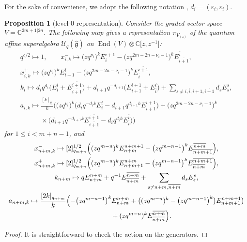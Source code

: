 \documentclass[pdftex]{sigma}
\numberwithin{equation}{section}
\newtheorem{Proposition}[Theorem]{Proposition}
 { \theoremstyle{definition}
\newtheorem{Definition}[Theorem]{Definition}
\newtheorem{Note}[Theorem]{Note}
\newtheorem{Example}[Theorem]{Example}
\newtheorem{Remark}[Theorem]{Remark} }
\begin{document}
For the sake of convenience, we adopt the following notation
, $ d_i=(\varepsilon_i,\varepsilon_i)$.
\begin{Proposition}[level-0 representation]\label{Level-0}
 Consider the graded vector space $V=\mathbb{C}^{2m+1|2n}$. The following map gives a representation $\pi_{V_{(z)}}$ of the quantum affine superalgebra $\mathcal{U}_q(\mathfrak{\hat{g}})$ on ${\operatorname{End}(V)\otimes\mathbb{C}\bigl[z, z^{-1}\bigr]}$:
\begin{gather*}
q^{c/2}\mapsto1,\qquad
 x_{i,k}^{-}\mapsto \bigl(zq^{\nu_i}\bigr)^kE^{i+1}_i-\bigl(zq^{2m-2n-\nu_i-1}\bigr)^kE^{\overline{i}}_{\overline{i+1}},\\
 x_{i,k}^{+}\mapsto \bigl(zq^{\nu_i}\bigr)^kE^{i}_{i+1}-\bigl(zq^{2m-2n-\nu_i-1}\bigr)^kE^{\overline{i+1}}_{\overline{i}},\\
 k_i\mapsto d_iq^{d_{i}}\bigl(E^{i}_{i}+E^{\overline{i+1}}_{\overline{i+1}}\bigr)+d_{i+1}q^{-d_{i+1}}\bigl(E^{i+1}_{i+1}+E^{\overline{i}}_{\overline{i}}\bigr)
 +\sum\limits_{s\neq i,\overline{i},i+1,\overline{i+1}}d_sE^{s}_{s},\\
 a_{i,k}\mapsto \frac{[k]_{q_i}}{k}\bigl( \bigl(zq^{\nu_i}\bigr)^k\bigl(d_iq^{-d_ik}E^{i}_{i}-d_{i+1}q^{d_{i+1}k}E^{i+1}_{i+1}\bigr)+
 \bigl(zq^{2m-2n-\nu_i-1}\bigr)^k\\
\phantom{ a_{i,k}\mapsto}{} \times\bigl(d_{i+1}q^{-d_{i+1}k}E^{\overline{i+1}}_{\overline{i+1}}-d_{i}q^{d_{i}k}E^{\overline{i}}_{\overline{i}}\bigr)\bigr)
\end{gather*}
for $1\leq i< m+n-1$, and
\begin{gather*}
 x_{n+m,k}^{-}\mapsto [2]_{q_{m+n}}^{1/2}\Bigl( (zq^{m-n})^kE^{n+m+1}_{n+m}-\bigl(zq^{m-n-1}\bigr)^kE^{\overline{n+m}}_{\overline{n+m+1}}\Bigr), \\
 x_{n+m,k}^{+}\mapsto [2]_{q_{m+n}}^{1/2}\Bigl( (zq^{m-n})^kE^{n+m}_{n+m+1}-\bigl(zq^{m-n-1}\bigr)^kE^{\overline{n+m+1}}_{\overline{n+m}}\Bigr), \\
 k_{n+m}\mapsto qE^{n+m}_{n+m}+q^{-1}E^{\overline{n+m}}_{\overline{n+m}}
 +\sum\limits_{s\neq n+m,\overline{n+m}}d_sE^{s}_{s},\\
 a_{n+m,k}\mapsto \frac{[2k]_{q_{n+m}}}{k}\Bigl( -\bigl(zq^{m-n-1}\bigr)^kE^{n+m}_{n+m}+\bigl((zq^{m-n})^k-\bigl(zq^{m-n-1}\bigr)^k\bigr)E^{n+m+1}_{n+m+1}\bigr)\\
 \phantom{ a_{n+m,k}\mapsto}{}+
 (zq^{m-n})^kE^{\overline{n+m}}_{\overline{n+m}}\Bigr).
\end{gather*}
\end{Proposition}
\begin{proof}
It is straightforward to check the action on the generators.
\end{proof}
\end{document}
